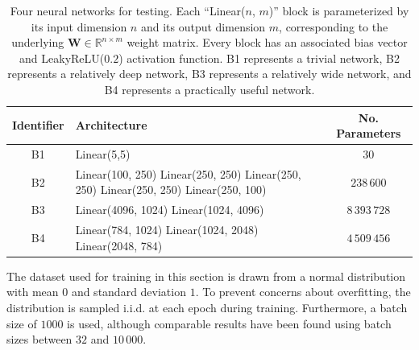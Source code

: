 \documentclass{article}
\newcommand{\vW}{\mathbf{W}}
\begin{document}
\begin{table}[htbp]
  \begin{center}
    \begin{tabular}{|c|p{}|c|}
      \hline
      \textbf{Identifier} & \textbf{Architecture}                                                                                                    & \textbf{No. Parameters} \\
      \hline
      \hline
      B1                  & Linear(5,5)                                                                                                              & $30$                    \\
      \hline
      B2                  & Linear(100, 250) \newline Linear(250, 250) \newline Linear(250, 250) \newline Linear(250, 250) \newline Linear(250, 100) & $238\,600$              \\
      \hline
      B3                  & Linear(4096, 1024) \newline Linear(1024, 4096)                                                                           & $8\,393\,728$           \\
      \hline
      B4                  & Linear(784, 1024) \newline Linear(1024, 2048) \newline Linear(2048, 784)                                                 & $4\,509\,456$           \\
      \hline
    \end{tabular}
    \vspace{5pt}
    \caption{Four neural networks for testing. Each ``Linear($n$, $m$)'' block is parameterized by its input dimension $n$ and its output dimension $m$, corresponding to the underlying $\vW \in \mathbb{R}^{n \times m}$ weight matrix. Every block has an associated bias vector and LeakyReLU($0.2$) activation function. B1 represents a trivial network, B2 represents a relatively deep network, B3 represents a relatively wide network, and B4 represents a practically useful network.}
    \label{tab:networks}
  \end{center}
\end{table}

The dataset used for training in this section is drawn from a normal distribution with mean $0$ and standard deviation $1$. To prevent concerns about overfitting, the distribution is sampled i.i.d. at each epoch during training. Furthermore, a batch size of $1000$ is used, although comparable results have been found using batch sizes between $32$ and $10\,000$.
\end{document}
